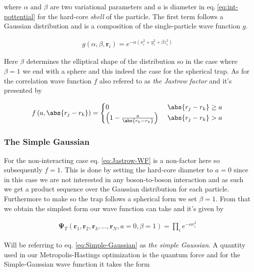 where $\alpha$ and $\beta$ are two variational parameters and $a$ is diameter in eq.$\ $\ref{eq:int-pottential} for the hard-core \textit{shell} of the particle. The first term follows a Gaussian distribution and is a composition of the single-particle wave function $g$.

\begin{align}
    g\left( \alpha, \beta, \mathbf{r}_i \right) = e^{-\alpha\left(x_i^2 + y_i^2 +\beta z_i^2\right)}
    \label{eq:one-body-WF}
\end{align}

Here $\beta$ determines the elliptical shape of the distribution so in the case where $\beta = 1$ we end with a sphere and this indeed the case for the spherical trap. As for the correlation wave function $f$ also refered to as \textit{the Jastrow factor} and it's presented by

\begin{align}
    f\left( a, \abs{r_j - r_k} \right) = 
  \begin{cases}
    0\ &\abs{r_j - r_k} \geq a\\
    \left( 1 - \frac{a}{\abs{r_k - r_k}} \right)\ &\abs{r_j - r_k} > a
  \end{cases}
  \label{eq:Jastrow-WF}
\end{align}

\subsubsection{The Simple Gaussian}

For the non-interacting case eq. \ref{eq:Jastrow-WF} is a non-factor here so subsequently $f=1$. This is done by setting the hard-core diameter to $a= 0$ since in this case we are not interested in any boson-to-boson interaction and as such we get a product sequence over the Gaussian distribution for each particle. Furthermore to make so the trap follows a spherical form we set $\beta= 1$. From that we obtain the simplest form our wave function can take and it's given by

\begin{align}
    \mathbf{\Psi}_T \left( \mathbf{r}_1, \mathbf{r}_2, \mathbf{r}_3, \dots, \mathbf{r}_N, a= 0 , \beta = 1  \right)  = \prod_i e^{-\alpha r_i^2}
    \label{eq:Simple-Gaussian}
\end{align}

Will be referring  to eq. \ref{eq:Simple-Gaussian} as \textit{the simple Gaussian}. A quantity used in our Metropolis-Hastings optimization is the quantum force and for the Simple-Gaussian wave function it takes the form

